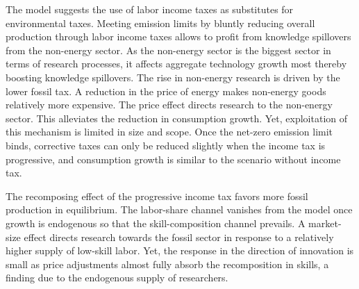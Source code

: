 The model suggests the use of labor income taxes as substitutes for environmental taxes. Meeting emission limits by bluntly reducing overall production through labor income taxes allows to profit from knowledge spillovers from the non-energy sector. As the non-energy sector is the biggest sector in terms of research processes, it affects aggregate technology growth most thereby boosting knowledge spillovers. 
The rise in non-energy research is driven by the lower fossil tax. A reduction in the price of energy makes non-energy goods relatively more expensive. The price effect directs research to the non-energy sector. This alleviates the reduction in consumption growth. 
Yet, exploitation of this mechanism is limited in size and scope. Once the net-zero emission limit binds, corrective taxes can only be reduced slightly when the income tax is progressive, and consumption growth is similar to the scenario without income tax. %

The recomposing effect of the progressive income tax favors more fossil production in equilibrium. 
 The labor-share channel vanishes from the model once growth is endogenous so that the skill-composition channel prevails. A market-size effect directs research towards the fossil sector in response to a relatively higher supply of low-skill labor. Yet,  the response in the direction of innovation is small as price adjustments almost fully absorb the recomposition in skills, a finding due to the endogenous supply of researchers.


